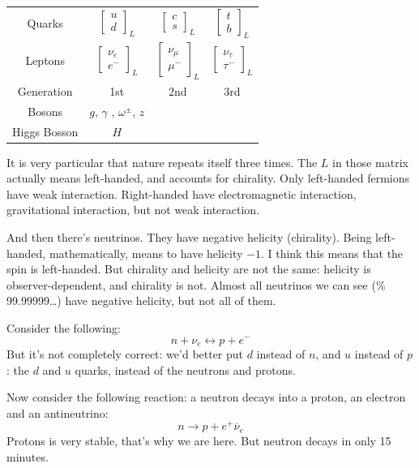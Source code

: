 \begin{tabular}{c c c c}
Quarks & $\begin{bmatrix} u\\d
\end{bmatrix}_L $ & $\begin{bmatrix} c\\s
\end{bmatrix}_L$ & $\begin{bmatrix} t\\b
\end{bmatrix}_L$\\
Leptons & $\begin{bmatrix} \nu_e\\e^-
\end{bmatrix}_L $ & $\begin{bmatrix}
\nu_\mu\\ \mu^-
\end{bmatrix}_L$ & $\begin{bmatrix}
\nu_\tau\\ \tau^- \end{bmatrix}_L$\\
Generation & 1st & 2nd & 3rd\\
Bosons & $g$, $\gamma$ , $\omega^\pm$, $z$ \\
Higgs Bosson & $H$
\end{tabular}

\medskip

It is very particular that nature repeats
itself three times. The $L$ in those
matrix actually means left-handed, and
accounts for chirality. Only left-handed
fermions have weak interaction. Right-handed
have electromagnetic interaction,
gravitational interaction, but not weak
interaction.

And then there's neutrinos. They have
negative helicity (chirality). Being
left-handed, mathematically, means to have
helicity $-1$. I think this means
that the spin is left-handed. But chirality
and helicity are not the same:
helicity is observer-dependent, and chirality
is not. Almost all neutrinos we
can see (\% 99.99999…) have negative
helicity, but not all of them.

Consider the following:
$$
n+\nu_e\leftrightarrow p+e^-
$$
But it's not completely correct: we'd better
put $d$ instead of $n$, and $u$
instead of $p$: the $d$ and $u$ quarks,
instead of the neutrons and protons.

Now consider the following reaction: a
neutron decays into a proton, an electron
and an antineutrino:
$$
n\to p+e^+\overline{\nu}_e
$$
Protons is very stable, that's why we are
here. But neutron decays in only 15
minutes.

